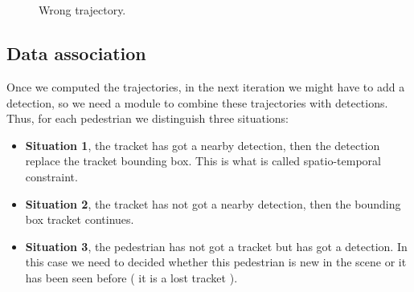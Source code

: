 \documentclass[12pt, a4paper, titlepage,twoside,openright]{article}
\begin{document}
\begin{figure}[H]
		
\centering

\\
\\
\caption{Wrong trajectory.}
\label{motion2nocoorrect}
\end{figure}





\subsection{Data association}


Once we computed the trajectories, in the next iteration we might have to add a detection, so we need a module to combine these trajectories with detections. Thus, for each pedestrian we distinguish three situations:

\begin{itemize}



\item \textbf{Situation 1}, the tracket has got a nearby detection, then the detection replace the tracket bounding box. This is what is called spatio-temporal constraint.

\item \textbf{Situation 2}, the tracket has not got a nearby detection, then the bounding box tracket continues.

\item \textbf{Situation 3}, the pedestrian has not got a tracket but has got a detection. In this case we need to decided whether this pedestrian is new in the scene or it has been seen before ( it is a lost tracket ).

\end{itemize}
\end{document}
